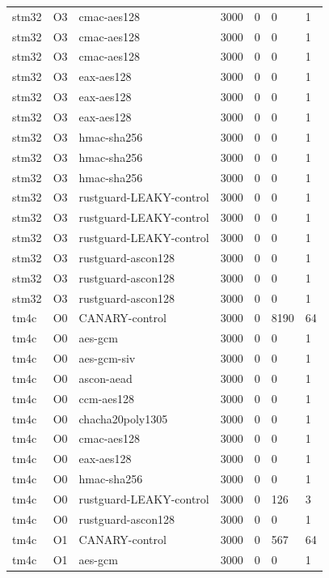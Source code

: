 \begin{table}[t]
\begin{tabular}{lllllll}
    stm32 & O3 & cmac-aes128 & 3000 & 0 & 0 & 1 \\
    stm32 & O3 & cmac-aes128 & 3000 & 0 & 0 & 1 \\
    stm32 & O3 & cmac-aes128 & 3000 & 0 & 0 & 1 \\
    stm32 & O3 & eax-aes128 & 3000 & 0 & 0 & 1 \\
    stm32 & O3 & eax-aes128 & 3000 & 0 & 0 & 1 \\
    stm32 & O3 & eax-aes128 & 3000 & 0 & 0 & 1 \\
    stm32 & O3 & hmac-sha256 & 3000 & 0 & 0 & 1 \\
    stm32 & O3 & hmac-sha256 & 3000 & 0 & 0 & 1 \\
    stm32 & O3 & hmac-sha256 & 3000 & 0 & 0 & 1 \\
    stm32 & O3 & rustguard-LEAKY-control & 3000 & 0 & 0 & 1 \\
    stm32 & O3 & rustguard-LEAKY-control & 3000 & 0 & 0 & 1 \\
    stm32 & O3 & rustguard-LEAKY-control & 3000 & 0 & 0 & 1 \\
    stm32 & O3 & rustguard-ascon128 & 3000 & 0 & 0 & 1 \\
    stm32 & O3 & rustguard-ascon128 & 3000 & 0 & 0 & 1 \\
    stm32 & O3 & rustguard-ascon128 & 3000 & 0 & 0 & 1 \\
    tm4c & O0 & CANARY-control & 3000 & 0 & 8190 & 64 \\
    tm4c & O0 & aes-gcm & 3000 & 0 & 0 & 1 \\
    tm4c & O0 & aes-gcm-siv & 3000 & 0 & 0 & 1 \\
    tm4c & O0 & ascon-aead & 3000 & 0 & 0 & 1 \\
    tm4c & O0 & ccm-aes128 & 3000 & 0 & 0 & 1 \\
    tm4c & O0 & chacha20poly1305 & 3000 & 0 & 0 & 1 \\
    tm4c & O0 & cmac-aes128 & 3000 & 0 & 0 & 1 \\
    tm4c & O0 & eax-aes128 & 3000 & 0 & 0 & 1 \\
    tm4c & O0 & hmac-sha256 & 3000 & 0 & 0 & 1 \\
    tm4c & O0 & rustguard-LEAKY-control & 3000 & 0 & 126 & 3 \\
    tm4c & O0 & rustguard-ascon128 & 3000 & 0 & 0 & 1 \\
    tm4c & O1 & CANARY-control & 3000 & 0 & 567 & 64 \\
    tm4c & O1 & aes-gcm & 3000 & 0 & 0 & 1 \\

\end{tabular}
\end{table}
